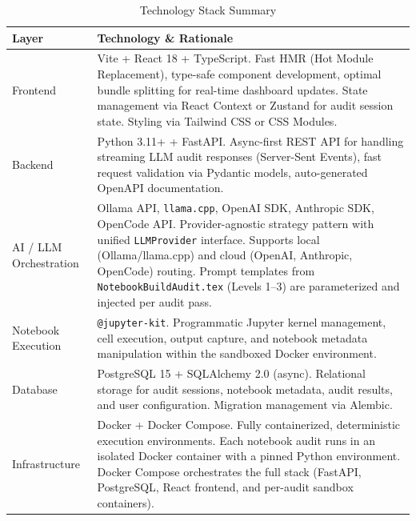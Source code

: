 \documentclass[11pt, a4paper]{article}
\begin{document}
\begin{table}[H]
  \centering
  \caption{Technology Stack Summary}
  \label{tab:techstack}
  \renewcommand{\arraystretch}{1.4}
  \begin{tabularx}{\textwidth}{l Y}
    \toprule
    \textbf{Layer} & \textbf{Technology \& Rationale} \\
    \midrule
    Frontend &
    Vite + React 18 + TypeScript. Fast HMR (Hot Module Replacement), type-safe
    component development, optimal bundle splitting for real-time dashboard updates.
    State management via React Context or Zustand for audit session state. Styling
    via Tailwind CSS or CSS Modules. \\

    Backend &
    Python 3.11+ + FastAPI. Async-first REST API for handling streaming LLM audit
    responses (Server-Sent Events), fast request validation via Pydantic models,
    auto-generated OpenAPI documentation. \\

    AI / LLM Orchestration &
    Ollama API, \texttt{llama.cpp}, OpenAI SDK, Anthropic SDK, OpenCode API.
    Provider-agnostic strategy pattern with unified \texttt{LLMProvider} interface.
    Supports local (Ollama/llama.cpp) and cloud (OpenAI, Anthropic, OpenCode)
    routing. Prompt templates from \texttt{NotebookBuildAudit.tex} (Levels 1--3)
    are parameterized and injected per audit pass. \\

    Notebook Execution &
    \texttt{@jupyter-kit}. Programmatic Jupyter kernel management, cell execution,
    output capture, and notebook metadata manipulation within the sandboxed Docker
    environment. \\

    Database &
    PostgreSQL 15 + SQLAlchemy 2.0 (async). Relational storage for audit sessions,
    notebook metadata, audit results, and user configuration. Migration management
    via Alembic. \\

    Infrastructure &
    Docker + Docker Compose. Fully containerized, deterministic execution
    environments. Each notebook audit runs in an isolated Docker container with a
    pinned Python environment. Docker Compose orchestrates the full stack (FastAPI,
    PostgreSQL, React frontend, and per-audit sandbox containers). \\

    \bottomrule
  \end{tabularx}
\end{table}
\end{document}
